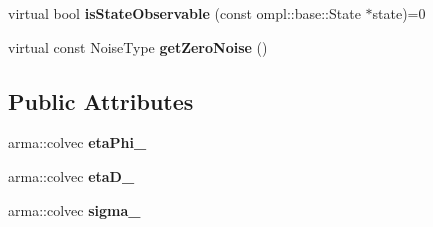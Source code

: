\begin{DoxyCompactItemize}
\item 
\hypertarget{class_observation_model_method_a351bcd27e192c0cc6f07650c3d9beb70}{virtual bool {\bfseries is\-State\-Observable} (const ompl\-::base\-::\-State $\ast$state)=0}\label{class_observation_model_method_a351bcd27e192c0cc6f07650c3d9beb70}

\item 
\hypertarget{class_observation_model_method_a86809e73a6e01b37f82fe822bd500b7b}{virtual const \-Noise\-Type {\bfseries get\-Zero\-Noise} ()}\label{class_observation_model_method_a86809e73a6e01b37f82fe822bd500b7b}

\end{DoxyCompactItemize}
\subsection*{\-Public \-Attributes}
\begin{DoxyCompactItemize}
\item 
\hypertarget{class_observation_model_method_a183fbeb021b40c30e29239b1c1b895bf}{arma\-::colvec {\bfseries eta\-Phi\-\_\-}}\label{class_observation_model_method_a183fbeb021b40c30e29239b1c1b895bf}

\item 
\hypertarget{class_observation_model_method_a7cd6d5c8235775f6227d3ee5458927db}{arma\-::colvec {\bfseries eta\-D\-\_\-}}\label{class_observation_model_method_a7cd6d5c8235775f6227d3ee5458927db}

\item 
\hypertarget{class_observation_model_method_a126bab071775905203dee38c709444c3}{arma\-::colvec {\bfseries sigma\-\_\-}}\label{class_observation_model_method_a126bab071775905203dee38c709444c3}

\end{DoxyCompactItemize}


